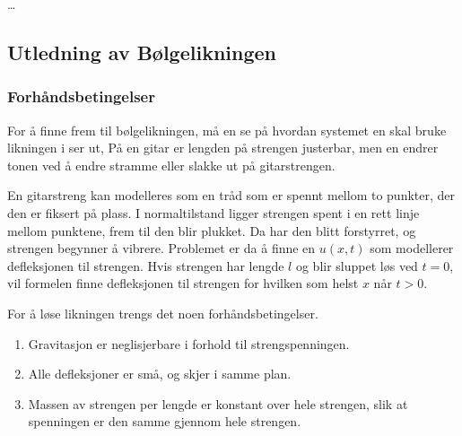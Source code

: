 \dots

\subsection{Utledning av Bølgelikningen} 
\subsubsection{Forhåndsbetingelser}
For å finne frem til bølgelikningen, må en se på hvordan systemet en skal bruke likningen i ser ut, 
På en gitar er lengden på strengen justerbar, men en endrer tonen ved å endre stramme eller slakke
ut på gitarstrengen. 

En gitarstreng kan modelleres som en tråd som er spennt mellom to punkter, der den er fiksert på plass. 
I normaltilstand ligger strengen spent i en rett linje mellom punktene, frem til den blir plukket. Da
har den blitt forstyrret, og strengen begynner å vibrere. Problemet er da å finne en $u(x,t)$ som modellerer
defleksjonen til strengen. Hvis strengen har lengde $l$ og blir sluppet løs ved $t=0$, vil formelen finne
defleksjonen til strengen for hvilken som helst $x$ når $t>0$. 

For å løse likningen trengs det noen forhåndsbetingelser.

\begin{enumerate}
	\item Gravitasjon er neglisjerbare i forhold til strengspenningen.
	\item Alle defleksjoner er små, og skjer i samme plan.
	\item Massen av strengen per lengde er konstant over hele strengen, slik at spenningen er den samme 
	gjennom hele strengen.
\end{enumerate}

